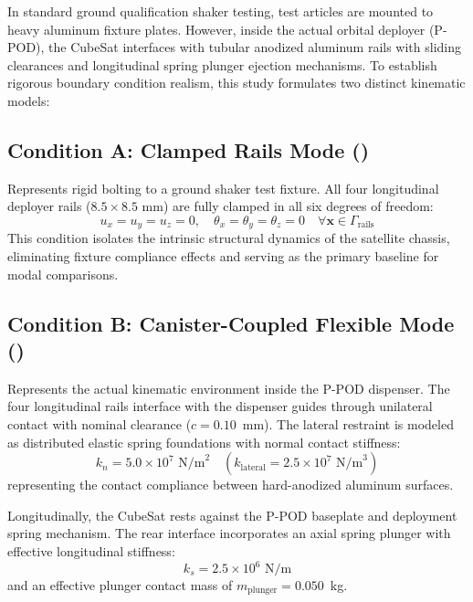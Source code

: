 \documentclass[preprint,12pt,3p]{elsarticle}
\newcommand{\code}[1]{\texttt{\detokenize{#1}}}
\newcommand{\rail}{8.5 \times 8.5\text{ mm}}
\begin{document}
In standard ground qualification shaker testing, test articles are mounted to heavy aluminum fixture plates. However, inside the actual orbital deployer (P-POD), the CubeSat interfaces with tubular anodized aluminum rails with sliding clearances and longitudinal spring plunger ejection mechanisms. To establish rigorous boundary condition realism, this study formulates two distinct kinematic models:

\subsection{Condition A: Clamped Rails Mode (\code{'clamped'})}
Represents rigid bolting to a ground shaker test fixture. All four longitudinal deployer rails ($\rail$) are fully clamped in all six degrees of freedom:
\begin{equation}
  u_x = u_y = u_z = 0, \quad \theta_x = \theta_y = \theta_z = 0 \quad \forall \mathbf{x} \in \Gamma_{\text{rails}}
  \label{eq:bc_clamped}
\end{equation}
This condition isolates the intrinsic structural dynamics of the satellite chassis, eliminating fixture compliance effects and serving as the primary baseline for modal comparisons.

\subsection{Condition B: Canister-Coupled Flexible Mode (\code{'test_pod_flexible'})}
Represents the actual kinematic environment inside the P-POD dispenser. The four longitudinal rails interface with the dispenser guides through unilateral contact with nominal clearance ($c = 0.10$~mm). The lateral restraint is modeled as distributed elastic spring foundations with normal contact stiffness:
\begin{equation}
  k_n = 5.0 \times 10^7\text{ N/m}^2 \quad (k_{\text{lateral}} = 2.5 \times 10^7\text{ N/m}^3)
\end{equation}
representing the contact compliance between hard-anodized aluminum surfaces.

Longitudinally, the CubeSat rests against the P-POD baseplate and deployment spring mechanism. The rear interface incorporates an axial spring plunger with effective longitudinal stiffness:
\begin{equation}
  k_s = 2.5 \times 10^6\text{ N/m}
\end{equation}
and an effective plunger contact mass of $m_{\text{plunger}} = 0.050$~kg.
\end{document}
